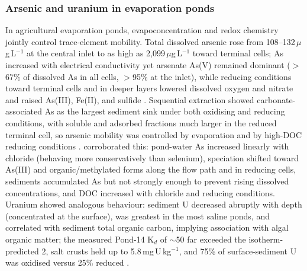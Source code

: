 \subsubsection{Arsenic and uranium in evaporation ponds}
In agricultural evaporation ponds, evapoconcentration and redox chemistry jointly control trace-element mobility. Total dissolved arsenic rose from 108--132\,$\mu$g\,L$^{-1}$ at the central inlet to as high as 2{,}099\,$\mu$g\,L$^{-1}$ toward terminal cells; As increased with electrical conductivity yet arsenate As(V) remained dominant ($>$67\% of dissolved As in all cells, $>$95\% at the inlet), while reducing conditions toward terminal cells and in deeper layers lowered dissolved oxygen and nitrate and raised As(III), Fe(II), and sulfide \parencite{Ryu2010}. Sequential extraction showed carbonate-associated As as the largest sediment sink under both oxidising and reducing conditions, with soluble and adsorbed fractions much larger in the reduced terminal cell, so arsenic mobility was controlled by evaporation and by high-DOC reducing conditions \parencite{Ryu2010}. \textcite{Gao2007} corroborated this: pond-water As increased linearly with chloride (behaving more conservatively than selenium), speciation shifted toward As(III) and organic/methylated forms along the flow path and in reducing cells, sediments accumulated As but not strongly enough to prevent rising dissolved concentrations, and DOC increased with chloride and reducing conditions. Uranium showed analogous behaviour: sediment U decreased abruptly with depth (concentrated at the surface), was greatest in the most saline ponds, and correlated with sediment total organic carbon, implying association with algal organic matter; the measured Pond-14 K$_d$ of $\sim$50 far exceeded the isotherm-predicted 2, salt crusts held up to 5.8\,mg\,U\,kg$^{-1}$, and 75\% of surface-sediment U was oxidised versus 25\% reduced \parencite{Duff1997}.

